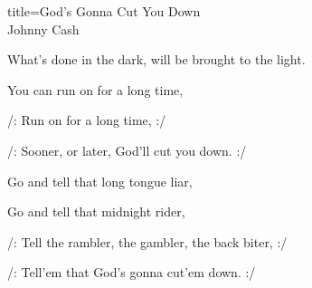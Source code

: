 \begin{song}{title=\centering God's Gonna Cut You Down \\\normalsize Johnny Cash \vspace*{-0.3cm}}
{What's done in the dark, will be brought to the light. 

\sloka
You can run on for a long time, 

/: Run on for a long time, :/ 

/: Sooner, or later, God'll cut you down. :/ 

\sloka
Go and tell that long tongue liar, 

Go and tell that midnight rider, 

/: Tell the rambler, the gambler, the back biter, :/ 

/: Tell'em that God's gonna  cut'em down. :/ 

}
\setcounter{Slokočet}{0}
\end{song}

